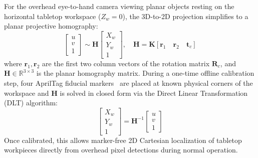 \documentclass[journal]{IEEEtran}
\begin{document}
For the overhead eye-to-hand camera viewing planar objects resting on the horizontal tabletop workspace ($Z_w = 0$), the 3D-to-2D projection simplifies to a planar projective homography:
\begin{equation}
\begin{bmatrix} u \\ v \\ 1 \end{bmatrix} \sim \mathbf{H} \begin{bmatrix} X_w \\ Y_w \\ 1 \end{bmatrix}, \quad \mathbf{H} = \mathbf{K} \left[ \mathbf{r}_1 \quad \mathbf{r}_2 \quad \mathbf{t}_c \right]
\end{equation}
where $\mathbf{r}_1, \mathbf{r}_2$ are the first two column vectors of the rotation matrix $\mathbf{R}_c$, and $\mathbf{H} \in \mathbb{R}^{3\times3}$ is the planar homography matrix. During a one-time offline calibration step, four AprilTag fiducial markers~\cite{aria_036_olson_2011_apriltag} are placed at known physical corners of the workspace and $\mathbf{H}$ is solved in closed form via the Direct Linear Transformation (DLT) algorithm:
\begin{equation}
\begin{bmatrix} X_w \\ Y_w \\ 1 \end{bmatrix} = \mathbf{H}^{-1} \begin{bmatrix} u \\ v \\ 1 \end{bmatrix}
\end{equation}
Once calibrated, this allows marker-free 2D Cartesian localization of tabletop workpieces directly from overhead pixel detections during normal operation.
\end{document}
